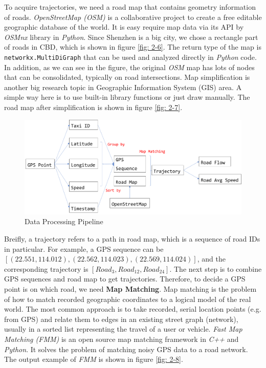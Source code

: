 \documentclass[fontset=none]{ctexart}
\theoremstyle{definition}
\theoremstyle{remark}
\begin{document}
To acquire trajectories, we need a road map that contains geometry information of roads.
\textit{OpenStreetMap (OSM)} is a collaborative project to create a free editable geographic database of the world.\cite{haklay2008openstreetmap}
It is easy require map data via its API by \textit{OSMnx} library in \textit{Python}. Since Shenzhen is a
big city, we chose a rectangle part of roads in CBD, which is shown in figure \ref{fig: 2-6}. The return type of
the map is \texttt{networkx.MultiDiGraph} that can be used and analyzed directly in \textit{Python} code.
In addition, as we can see in the figure, the original \textit{OSM} map has lots of nodes that can be
consolidated, typically on road intersections. Map simplification is another big research topic in 
Geographic Information System (GIS) area. A simple way here is to use built-in library functions or just
draw manually. The road map after simplification is shown in figure \ref{fig: 2-7}.

\begin{figure}[htb]
  \centering
  \includegraphics[width=\textwidth]{images/mid/2-4.png}
  \caption{Data Processing Pipeline}
  \label{fig: 2-4}
\end{figure}

Breifly, a trajectory refers to a path in road map, which is a sequence of road IDs in particular.
For example, a GPS sequence can be $[(22.551, 114.012), (22.562, 114.023), (22.569, 114.024)]$, and
the corresponding trajectory is $[Road_{3}, Road_{12}, Road_{24}]$.
The next step is to combine GPS sequences and road map to get trajectories.
Therefore, to decide a GPS point is on which road, we need \textbf{Map Matching}.
Map matching is the problem of how to match recorded geographic coordinates to a logical model of the real world.
The most common approach is to take recorded, serial location points (e.g. from GPS) and relate them to edges in an existing street graph (network), usually in a sorted list representing the travel of a user or vehicle.
\textit{Fast Map Matching (FMM)}\cite{Yang2018FastMM} is an open source map matching framework in \textit{C++} and \textit{Python}. It solves the problem of matching noisy GPS data to a road network.
The output example of \textit{FMM} is shown in figure \ref{fig: 2-8}.
\end{document}
